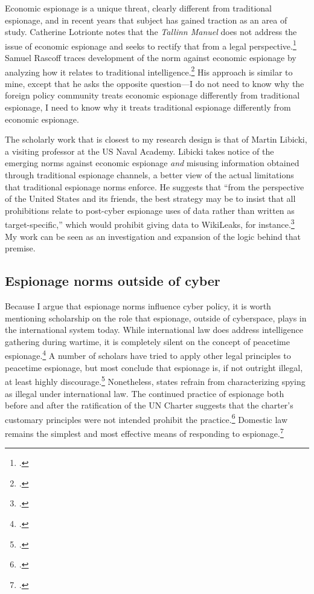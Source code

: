 \documentclass[11pt]{memoir}
\begin{document}
\begin{refsegment}
Economic espionage is a unique threat, clearly different from traditional espionage, and in recent years that subject has gained traction as an area of study. Catherine Lotrionte notes that the \emph{Tallinn Manuel} does not address the issue of economic espionage and seeks to rectify that from a legal perspective.\footcite{lotrionte_countering_2015} Samuel Rascoff traces development of the norm against economic espionage by analyzing how it relates to traditional intelligence.\footcite{rascoff_norm_2016} His approach is similar to mine, except that he asks the opposite question---I do not need to know why the foreign policy community treats economic espionage differently from traditional espionage, I need to know why it treats traditional espionage differently from economic espionage.

The scholarly work that is closest to my research design is that of Martin Libicki, a visiting professor at the US Naval Academy. Libicki takes notice of the emerging norms against economic espionage \emph{and} misusing information obtained through traditional espionage channels, a better view of the actual limitations that traditional espionage norms enforce. He suggests that ``from the perspective of the United States and its friends, the best strategy may be to insist that all prohibitions relate to post-cyber espionage uses of data rather than written as target-specific,'' which would prohibit giving data to WikiLeaks, for instance.\footcite[p.~11]{libicki_coming_2017} My work can be seen as an investigation and expansion of the logic behind that premise.


\subsection{Espionage norms outside of cyber}
Because I argue that espionage norms influence cyber policy, it is worth mentioning scholarship on the role that espionage, outside of cyberspace, plays in the international system today. While international law does address intelligence gathering during wartime, it is completely silent on the concept of peacetime espionage.\footcite{radsan_unresolved_2007} A number of scholars have tried to apply other legal principles to peacetime espionage, but most conclude that espionage is, if not outright illegal, at least highly discourage.\footcite[p.~656]{beim_enforcing_2018} Nonetheless, states refrain from characterizing spying as illegal under international law. The continued practice of espionage both before and after the ratification of the UN Charter suggests that the charter's customary principles were not intended prohibit the practice.\footcite[p.~305]{deeks_international_2015} Domestic law remains the simplest and most effective means of responding to espionage.\footcite[p.~657]{beim_enforcing_2018}


\end{refsegment}
\end{document}
